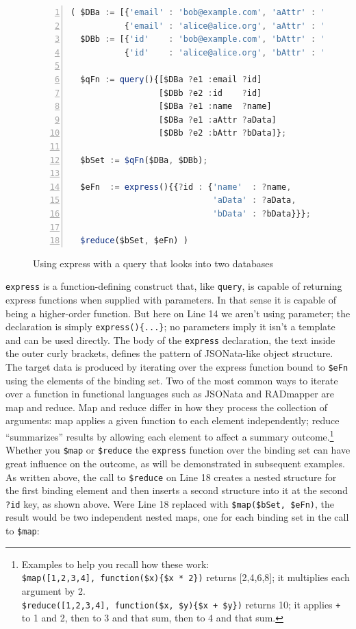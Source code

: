 \documentclass[10pt,letterpaper]{article} %
\newcommand{\stt}[1]{\texttt{#1}} %
\begin{document}
\begin{figure}[H]
    \caption{Using express with a query that looks into two databases}
    \label{code:two-database-query-express}
\begin{lstlisting}[language=JavaScript,numberstyle=\scriptsize,basicstyle=\ttfamily\scriptsize,numbers=left,stepnumber=1,breaklines=true]
( $DBa := [{'email' : 'bob@example.com', 'aAttr' : 'Bob-A-data',   'name' : 'Bob'},
           {'email' : 'alice@alice.org', 'aAttr' : 'Alice-A-data', 'name' : 'Alice'}];
  $DBb := [{'id'    : 'bob@example.com', 'bAttr' : 'Bob-B-data'},
           {'id'    : 'alice@alice.org', 'bAttr' : 'Alice-B-data'}];

  $qFn := query(){[$DBa ?e1 :email ?id]
                  [$DBb ?e2 :id    ?id]
                  [$DBa ?e1 :name  ?name]
                  [$DBa ?e1 :aAttr ?aData]
                  [$DBb ?e2 :bAttr ?bData]};

  $bSet := $qFn($DBa, $DBb);

  $eFn  := express(){{?id : {'name'  : ?name,
                             'aData' : ?aData,
                             'bData' : ?bData}}};

  $reduce($bSet, $eFn) )
\end{lstlisting}
\end{figure} \vspace{-2em}

\stt{express} is a function-defining construct that, like \stt{query}, is capable of returning express functions when supplied with parameters.
In that sense it is capable of being a higher-order function.
But here on Line 14 we aren't using parameter; the declaration is simply \stt{express()\{...\}}; no parameters imply it isn't a template and can be used directly.
The body of the \stt{express} declaration, the text inside the outer curly brackets, defines the pattern of JSONata-like object structure.
The target data is produced by iterating over the express function bound to \stt{\$eFn} using the elements of the binding set.
Two of the most common ways to iterate over a function in functional languages such as JSONata and RADmapper are map and reduce.
Map and reduce differ in how they process the collection of arguments:
map applies a given function to each element independently;
reduce ``summarizes'' results by allowing each element to affect a summary outcome.\footnote{Examples to help you recall how these work:
  \\ \stt{\$map([1,2,3,4], function(\$x)\{\$x * 2\})} returns [2,4,6,8]; it multiplies each argument by 2.
  \\ \stt{\$reduce([1,2,3,4], function(\$x, \$y)\{\$x + \$y\})} returns 10; it applies \stt{+} to 1 and 2, then to 3 and that sum,
  then to 4 and that sum.}
Whether you \stt{\$map} or \stt{\$reduce} the \stt{express} function over the binding set can have great influence on the outcome, as will be demonstrated in subsequent examples.
As written above, the call to \stt{\$reduce} on Line 18 creates a nested structure for the first binding element and then inserts a second structure into it at the second \stt{?id} key, as shown above.
Were Line 18 replaced with \stt{\$map(\$bSet, \$eFn)}, the result would be two independent nested maps, one for each binding set in the call to \stt{\$map}:
\end{document}
